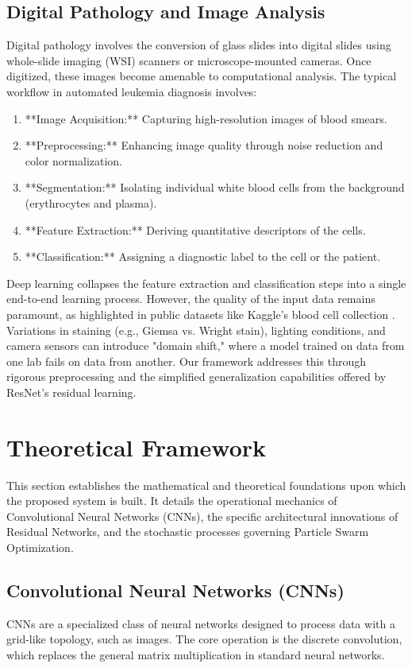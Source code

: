 \documentclass[11pt, a4paper]{article}
\begin{document}
\subsection{Digital Pathology and Image Analysis}
Digital pathology involves the conversion of glass slides into digital slides using whole-slide imaging (WSI) scanners or microscope-mounted cameras. Once digitized, these images become amenable to computational analysis. The typical workflow in automated leukemia diagnosis involves:
\begin{enumerate}
    \item **Image Acquisition:** Capturing high-resolution images of blood smears.
    \item **Preprocessing:** Enhancing image quality through noise reduction and color normalization.
    \item **Segmentation:** Isolating individual white blood cells from the background (erythrocytes and plasma).
    \item **Feature Extraction:** Deriving quantitative descriptors of the cells.
    \item **Classification:** Assigning a diagnostic label to the cell or the patient.
\end{enumerate}

Deep learning collapses the feature extraction and classification steps into a single end-to-end learning process. However, the quality of the input data remains paramount, as highlighted in public datasets like Kaggle's blood cell collection \cite{r9}. Variations in staining (e.g., Giemsa vs. Wright stain), lighting conditions, and camera sensors can introduce "domain shift," where a model trained on data from one lab fails on data from another. Our framework addresses this through rigorous preprocessing and the simplified generalization capabilities offered by ResNet's residual learning.

\section{Theoretical Framework}
This section establishes the mathematical and theoretical foundations upon which the proposed system is built. It details the operational mechanics of Convolutional Neural Networks (CNNs), the specific architectural innovations of Residual Networks, and the stochastic processes governing Particle Swarm Optimization.

\subsection{Convolutional Neural Networks (CNNs)}
CNNs are a specialized class of neural networks designed to process data with a grid-like topology, such as images. The core operation is the discrete convolution, which replaces the general matrix multiplication in standard neural networks.
\end{document}
